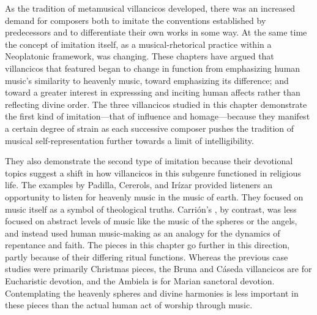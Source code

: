 As the tradition of metamusical villancicos developed, there was an increased demand for composers both to imitate the conventions established by predecessors and to differentiate their own works in some way. 
At the same time the concept of imitation itself, as a musical-rhetorical practice within a Neoplatonic framework, was changing.
These chapters have argued that villancicos that featured  began to change in function from emphasizing human music's similarity to heavenly music, toward emphasizing its difference; and toward a greater interest in expresssing and inciting human affects rather than reflecting divine order.
The three villancicos studied in this chapter demonstrate the first kind of imitation---that of influence and homage---because they manifest a certain degree of strain as each successive composer pushes the tradition of musical self-representation further towards a limit of intelligibility.

They also demonstrate the second type of imitation because their devotional topics suggest a shift in how villancicos in this subgenre functioned in religious life.
The examples by Padilla, Cererols, and Irízar provided listeners an opportunity to listen for heavenly music in the music of earth. 
They focused on music itself as a symbol of theological truths.
Carrión's , by contrast, was less focused on abstract levels of music like the music of the spheres or the angels, and instead used human music-making as an analogy for the dynamics of repentance and faith.
The pieces in this chapter go further in this direction, partly because of their differing ritual functions.
Whereas the previous case studies were primarily Christmas pieces, the Bruna and Cáseda villancicos are for Eucharistic devotion, and the Ambiela is for Marian sanctoral devotion.
Contemplating the heavenly spheres and divine harmonies is less important in these pieces than the actual human act of worship through music.


